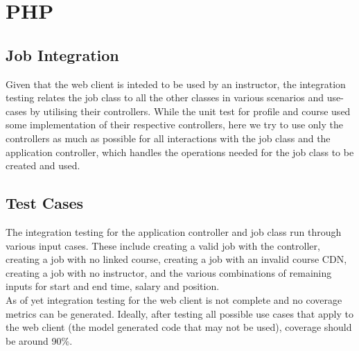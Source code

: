 \documentclass[12pt]{report}
\begin{document}
\section{PHP}
\subsection{Job Integration}
	Given that the web client is inteded to be used by an instructor, the integration testing relates the job class to all the other classes in various scenarios and use-cases by utilising their controllers. While the unit test for profile and course used some implementation of their respective controllers, here we try to use only the controllers as much as possible for all interactions with the job class and the application controller, which handles the operations needed for the job class to be created and used.

\subsection{Test Cases}
	The integration testing for the application controller and job class run through various input cases. These include creating a valid job with the controller, creating a job with no linked course, creating a job with an invalid course CDN, creating a job with no instructor, and the various combinations of remaining inputs for start and end time, salary and position.\\

	As of yet integration testing for the web client is not complete and no coverage metrics can be generated. Ideally, after testing all possible use cases that apply to the web client (the model generated code that may not be used), coverage should be around 90\%.\\
\end{document}
